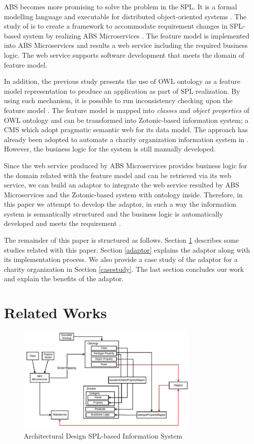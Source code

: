 \documentclass[conference]{IEEEtran}
\begin{document}
ABS becomes more promising to solve the problem in the SPL. It is a formal modelling language and executable for distributed object-oriented systems \cite{ABS}\cite{ABSTutorial}. The study of \cite{absmc} is to create a framework to accommodate requirement changes in SPL-based system by realizing ABS Microservices \cite{absmc}. The feature model is implemented into ABS Microservices and results a web service including the required business logic. The web service supports software development that meets the domain of feature model.

In addition, the previous study \cite{fmontology} presents the use of OWL ontology as a feature model representation to produce an application as part of SPL realization. By using such mechanism, it is possible to run inconsistency checking upon the feature model \cite{verify}. The feature model is mapped into \textit{classes} and \textit{object properties} of OWL ontology and can be transformed into Zotonic-based information system; a CMS which adopt pragmatic semantic web for its data model. The approach has already been adopted to automate a charity organization information system in \cite{bravyto}. However, the business logic for the system is still manually developed.

Since the web service produced by ABS Microservices provides business logic for the domain related with the feature model and can be retrieved via its web service, we can build an adaptor to integrate the web service resulted by ABS Microservices and the Zotonic-based system with ontology inside. Therefore, in this paper we attempt to develop the adaptor, in such a way the information system is semantically structured and the business logic is automatically developed and meets the requirement .

The remainder of this paper is structured as follows. Section \ref{relatedworks} describes some studies related with this paper. Section \ref{adaptor} explains the adaptor along with its implementation process. We also provide a case study of the adaptor for a charity organization in Section \ref{casestudy}. The last section concludes our work and explain the benefits of the adaptor. 

\section{Related Works} \label{relatedworks}

\begin{figure}[h]
\centering
\includegraphics[width=3.5in]{overallsysdes}

\caption{Architectural Design SPL-based Information System}
\label{fig_sysdes}
\end{figure}
\end{document}
